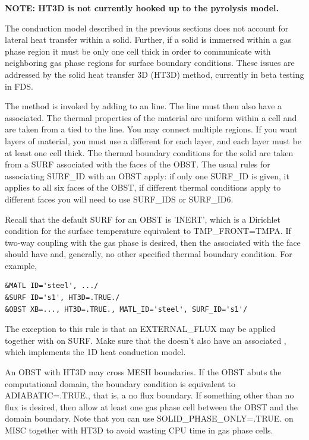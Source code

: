 \documentclass[11pt]{book}
\begin{document}
{\bf NOTE: {\ct HT3D} is not currently hooked up to the pyrolysis model.}
\baselineskip

The conduction model described in the previous sections does not account for lateral heat transfer within a solid.  Further, if a solid is immersed within a gas phase region it must be only one cell thick in order to communicate with neighboring gas phase regions for surface boundary conditions.  These issues are addressed by the solid heat transfer 3D ({\ct HT3D}) method, currently in beta testing in FDS.

The method is invoked by adding {} to an {} line.  The {} line must then also have a {} associated.  The thermal properties of the material are uniform within a cell and are taken from a {} tied to the {} line.  You may connect multiple {} regions.  If you want layers of material, you must use a different {} for each layer, and each layer must be at least one cell thick. The thermal boundary conditions for the solid are taken from a {\ct SURF} associated with the faces of the {\ct OBST}.  The usual rules for associating {\ct SURF\_ID} with an {\ct OBST} apply: if only one {\ct SURF\_ID} is given, it applies to all six faces of the {\ct OBST}, if different thermal conditions apply to different faces you will need to use {\ct SURF\_IDS} or {\ct SURF\_ID6}.

Recall that the default {\ct SURF} for an {\ct OBST} is {\ct 'INERT'}, which is a Dirichlet condition for the surface temperature equivalent to {\ct TMP\_FRONT=TMPA}.  If two-way coupling with the gas phase is desired, then the {} associated with the {} face should have {} and, generally, no other specified thermal boundary condition.  For example,
\begin{lstlisting}
&MATL ID='steel', .../
&SURF ID='s1', HT3D=.TRUE./
&OBST XB=..., HT3D=.TRUE., MATL_ID='steel', SURF_ID='s1'/
\end{lstlisting}
The exception to this rule is that an {\ct EXTERNAL\_FLUX} may be applied together with {} on {\ct SURF}.  Make sure that the {} doesn't also have an associated {}, which implements the 1D heat conduction model.

An {\ct OBST} with {\ct HT3D} may cross {\ct MESH} boundaries.  If the {\ct OBST} abuts the computational domain, the boundary condition is equivalent to {\ct ADIABATIC=.TRUE.}, that is, a no flux boundary.  If something other than no flux is desired, then allow at least one gas phase cell between the {\ct OBST} and the domain boundary.  Note that you can use {\ct SOLID\_PHASE\_ONLY=.TRUE.} on {\ct MISC} together with {\ct HT3D} to avoid wasting CPU time in gas phase cells.
\end{document}
